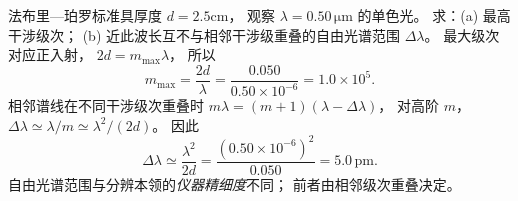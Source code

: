 法布里—珀罗标准具厚度 $d=2.5$cm，
观察 $\lambda=0.50\,\mathrm{\mu m}$ 的单色光。
求：(a) 最高干涉级次；
(b) 近此波长互不与相邻干涉级重叠的自由光谱范围 $\Delta\lambda$。
\exsolution
最大级次对应正入射，
$2d=m_{\max}\lambda$，
所以
\[
\boxed{m_{\max}=\frac{2d}{\lambda}
=\frac{0.050}{0.50\times10^{-6}}
=1.0\times10^5}.
\]
相邻谱线在不同干涉级次重叠时
$m\lambda=(m+1)(\lambda-\Delta\lambda)$，
对高阶 $m$，
$\Delta\lambda\simeq\lambda/m\simeq\lambda^2/(2d)$。
因此
\[
\boxed{\Delta\lambda\simeq
\frac{\lambda^2}{2d}
=\frac{(0.50\times10^{-6})^2}{0.050}
=5.0\,\mathrm{pm}}.
\]
\excheck 自由光谱范围与分辨本领的\emph{仪器精细度}不同；
前者由相邻级次重叠决定。
